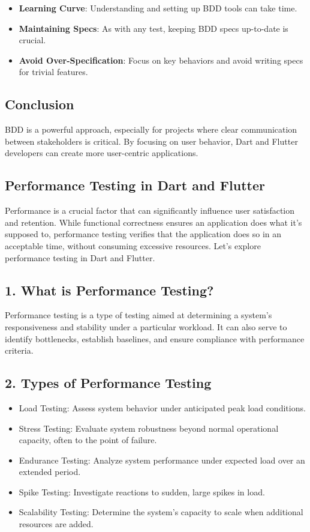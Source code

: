 \begin{itemize}
 \item \textbf{Learning Curve}: Understanding and setting up BDD tools can take time.
 \item \textbf{Maintaining Specs}: As with any test, keeping BDD specs up-to-date is crucial.
 \item \textbf{Avoid Over-Specification}: Focus on key behaviors and avoid writing specs for trivial features.
\end{itemize}

\subsection*{Conclusion}

BDD is a powerful approach, especially for projects where clear communication between stakeholders is critical. 
By focusing on user behavior, Dart and Flutter developers can create more user-centric applications.


\subsection{Performance Testing in Dart and Flutter}

Performance is a crucial factor that can significantly influence user satisfaction and retention. While functional correctness ensures an application does what it's supposed to, performance testing verifies that the application does so in an acceptable time, without consuming excessive resources. Let's explore performance testing in Dart and Flutter.

\subsection*{1. What is Performance Testing?}

Performance testing is a type of testing aimed at determining a system's responsiveness and stability under a particular workload. 
It can also serve to identify bottlenecks, establish baselines, and ensure compliance with performance criteria.

\subsection*{2. Types of Performance Testing}

\begin{itemize}
 \item Load Testing: Assess system behavior under anticipated peak load conditions.
 \item Stress Testing: Evaluate system robustness beyond normal operational capacity, often to the point of failure.
 \item Endurance Testing: Analyze system performance under expected load over an extended period.
 \item Spike Testing: Investigate reactions to sudden, large spikes in load.
 \item Scalability Testing: Determine the system's capacity to scale when additional resources are added.
\end{itemize}

